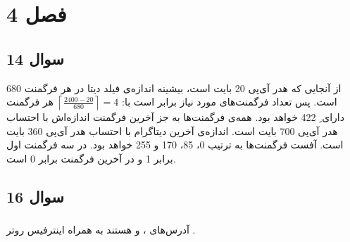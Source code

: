 \documentclass{article}
\begin{document}


\newpage

\section{فصل 4}
\subsection{سوال 14}
از آنجایی که هدر آی‌پی 20 بایت است، بیشینه اندازه‌ی فیلد دیتا در هر فرگمنت 680 است. پس تعداد فرگمنت‌های مورد نیاز برابر است با:
$
\left\lceil \frac{2400-20}{680} \right\rceil=4
$
هر فرگمنت دارای ِ 422 خواهد بود. همه‌ی فرگمنت‌ها به جز آخرین فرگمنت اندازه‌اش با احتساب هدر آی‌پی 700 بایت است. اندازه‌ی آخرین دیتاگرام با احتساب هدر آی‌پی 360 بایت است. آفست فرگمنت‌ها به ترتیب 0، 85، 170 و 255 خواهد بود.  در سه فرگمنت اول برابر 1 و در آخرین فرگمنت برابر 0 است.
\subsection{سوال 16}
\subsubsection{}
آدرس‌های  ،  و  هستند به همراه اینترفیس روتر .
\end{document}
